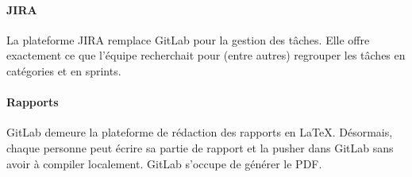 	\paragraph{JIRA} La plateforme JIRA remplace GitLab pour la gestion des tâches. Elle offre exactement ce que l'équipe recherchait pour (entre autres) regrouper les tâches en catégories et en sprints.
	
	\paragraph{Rapports} GitLab demeure la plateforme de rédaction des rapports en \LaTeX. Désormais, chaque personne peut écrire sa partie de rapport et la pusher dans GitLab sans avoir à compiler localement. GitLab s'occupe de générer le PDF.
	
	
